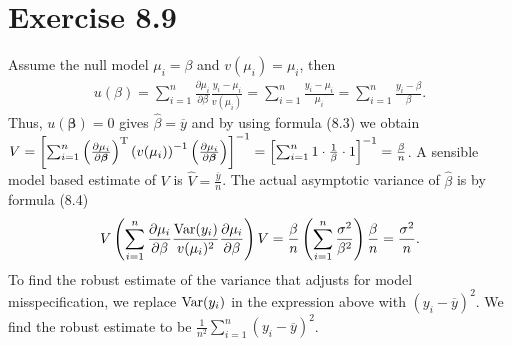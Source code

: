 \section*{Exercise 8.9}
Assume the null model $\mu_{i} = \beta$ and $v(\mu_{i}) = \mu_{i}$, then
\begin{align*}
u(\beta) = \sum_{i=1}^{n}\frac{\partial \mu_{i}}{\partial \beta} \frac{y_{i}-\mu_{i}}{v(\mu_{i})} = \sum_{i=1}^{n}\frac{y_{i}-\mu_{i}}{\mu_{i}} = \sum_{i=1}^{n}\frac{y_{i}-\beta}{\beta}.
\end{align*}
Thus, $u(\bm{\beta}) = 0$ gives $\widehat{\beta} = \overline{y}$ and by using formula (8.3) we obtain $V = \left[\sum_{i=1}^{n}\left(\frac{\partial \mu_{i}}{\partial \bm{\beta}}\right)^{\rm T}\left(v(\mu_{i})\right)^{-1}\left(\frac{\partial \mu_{i}}{\partial \bm{\beta}}\right)\right]^{-1} = \left[\sum_{i=1}^{n}1 \cdot \frac{1}{\beta} \cdot 1\right]^{-1} = \frac{\beta}{n}$. A sensible model based estimate of $V$ is $\widehat{V} = \frac{\overline{y}}{n}$. The actual asymptotic variance of $\widehat{\beta}$ is by formula (8.4)
\begin{align*}
V\left(\sum_{i=1}^{n}\frac{\partial \mu_{i}}{\partial \beta}\frac{\mathrm{Var}(y_{i})}{v(\mu_{i})^{2}}\frac{\partial \mu_{i}}{\partial \beta}\right)V = \frac{\beta}{n}\left(\sum_{i=1}^{n}\frac{\sigma^{2}}{\beta^{2}}\right)\frac{\beta}{n} = \frac{\sigma^{2}}{n}.
\end{align*}
To find the robust estimate of the variance that adjusts for model misspecification, we replace $\mathrm{Var}(y_{i})$ in the expression above with $(y_{i}-\overline{y})^{2}$. We find the robust estimate to be $\frac{1}{n^{2}}\sum_{i=1}^{n}(y_{i}-\overline{y})^{2}$.